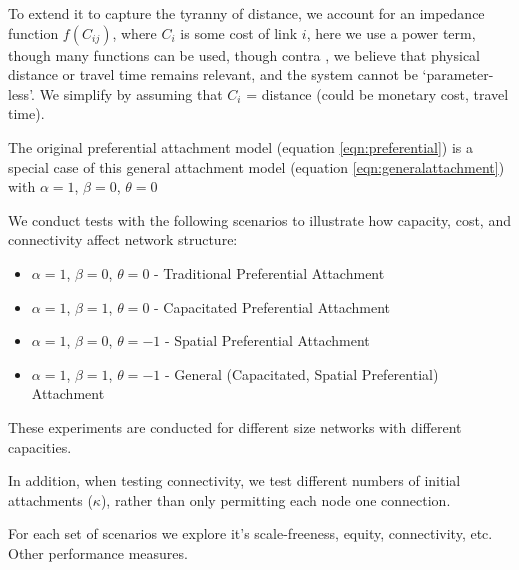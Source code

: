\documentclass{article}[12pt]
\begin{document}
To extend it to capture the tyranny of distance, we account for an impedance function $f(C_{ij})$, where $C_{i}$ is some cost of link $i$, here we use a power term, though many functions can be used, though contra \cite{simini2012universal}, we believe that physical distance or travel time remains relevant, and the system cannot be `parameter-less'. We simplify by assuming that $C_{i}$ = distance  (could be monetary cost, travel time).

The original preferential attachment model (equation \ref{eqn:preferential}) is a special case of this general attachment model (equation \ref{eqn:generalattachment}) with $\alpha=1$, $\beta=0$, $\theta=0$

We conduct tests with the following scenarios to illustrate how capacity, cost, and connectivity affect network structure:

\begin{itemize}
    \item $\alpha=1$, $\beta=0$, $\theta=0$ - Traditional Preferential Attachment
    \item $\alpha=1$, $\beta=1$, $\theta=0$ - Capacitated Preferential Attachment
    \item $\alpha=1$, $\beta=0$, $\theta=-1$ - Spatial Preferential Attachment
    \item $\alpha=1$, $\beta=1$, $\theta=-1$ - General (Capacitated, Spatial Preferential) Attachment
\end{itemize}


These experiments are conducted for different size networks with different capacities.
  
In addition, when testing connectivity, we test different numbers of initial attachments ($\kappa$), rather than only permitting each node one connection. %

For each set of scenarios we explore it's scale-freeness, equity, connectivity, etc. Other performance measures.




\end{document}
